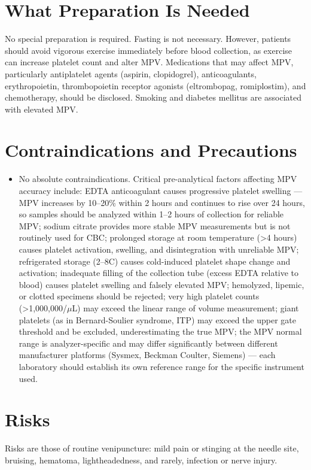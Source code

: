 \section*{What Preparation Is Needed}
No special preparation is required. Fasting is not necessary. However, patients should avoid vigorous exercise immediately before blood collection, as exercise can increase platelet count and alter MPV. Medications that may affect MPV, particularly antiplatelet agents (aspirin, clopidogrel), anticoagulants, erythropoietin, thrombopoietin receptor agonists (eltrombopag, romiplostim), and chemotherapy, should be disclosed. Smoking and diabetes mellitus are associated with elevated MPV.

\section*{Contraindications and Precautions}
\begin{itemize}
  \item No absolute contraindications. Critical pre-analytical factors affecting MPV accuracy include: EDTA anticoagulant causes progressive platelet swelling --- MPV increases by 10--20\% within 2 hours and continues to rise over 24 hours, so samples should be analyzed within 1--2 hours of collection for reliable MPV; sodium citrate provides more stable MPV measurements but is not routinely used for CBC; prolonged storage at room temperature (>4 hours) causes platelet activation, swelling, and disintegration with unreliable MPV; refrigerated storage (2--8\textdegree{}C) causes cold-induced platelet shape change and activation; inadequate filling of the collection tube (excess EDTA relative to blood) causes platelet swelling and falsely elevated MPV; hemolyzed, lipemic, or clotted specimens should be rejected; very high platelet counts (>1,000,000/$\mu$L) may exceed the linear range of volume measurement; giant platelets (as in Bernard-Soulier syndrome, ITP) may exceed the upper gate threshold and be excluded, underestimating the true MPV; the MPV normal range is analyzer-specific and may differ significantly between different manufacturer platforms (Sysmex, Beckman Coulter, Siemens) --- each laboratory should establish its own reference range for the specific instrument used.
\end{itemize}
\section*{Risks}
Risks are those of routine venipuncture: mild pain or stinging at the needle site, bruising, hematoma, lightheadedness, and rarely, infection or nerve injury.

